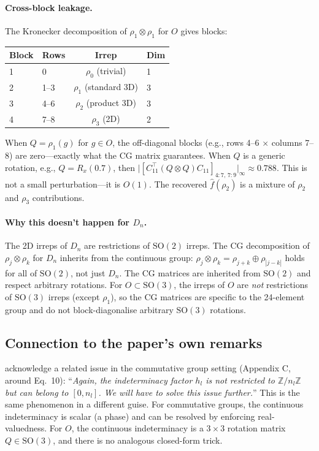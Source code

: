 \documentclass{article}
\newcommand{\SO}{\mathrm{SO}}
\newcommand{\abs}[1]{\lvert #1 \rvert}
\begin{document}
\paragraph{Cross-block leakage.}
The Kronecker decomposition of $\rho_1 \otimes \rho_1$ for $O$ gives
blocks:

\begin{center}
\small
\begin{tabular}{llcl}
  \toprule
  Block & Rows & Irrep & Dim \\
  \midrule
  1 & 0     & $\rho_0$ (trivial)     & 1 \\
  2 & 1--3  & $\rho_1$ (standard 3D) & 3 \\
  3 & 4--6  & $\rho_2$ (product 3D)  & 3 \\
  4 & 7--8  & $\rho_3$ (2D)          & 2 \\
  \bottomrule
\end{tabular}
\end{center}

When $Q = \rho_1(g)$ for $g \in O$, the off-diagonal blocks (e.g.,
rows 4--6 $\times$ columns 7--8) are zero---exactly what the CG
matrix guarantees. When $Q$ is a generic rotation, e.g.,
$Q = R_x(0.7)$, then
$\abs{[C_{11}^\top (Q \otimes Q) C_{11}]_{4:7,\, 7:9}}_\infty
\approx 0.788$.
This is not a small perturbation---it is $O(1)$. The recovered
$\hat{f}(\rho_2)$ is a mixture of $\rho_2$ and $\rho_3$ contributions.

\paragraph{Why this doesn't happen for $D_n$.}
The 2D irreps of $D_n$ are restrictions of $\SO(2)$ irreps. The CG
decomposition of $\rho_j \otimes \rho_k$ for $D_n$ inherits from the
continuous group: $\rho_j \otimes \rho_k = \rho_{j+k} \oplus
\rho_{|j-k|}$ holds for all of $\SO(2)$, not just $D_n$. The CG
matrices are inherited from $\SO(2)$ and respect arbitrary rotations.
For $O \subset \SO(3)$, the irreps of $O$ are \emph{not} restrictions
of $\SO(3)$ irreps (except $\rho_1$), so the CG matrices are specific
to the 24-element group and do not block-diagonalise arbitrary
$\SO(3)$ rotations.

\subsection{Connection to the paper's own remarks}

\citet{mataigne2024selective} acknowledge a related issue in the
commutative group setting (Appendix C, around Eq.~10):
``\emph{Again, the indeterminacy factor $h_l$ is not restricted to
$\mathbb{Z}/n_l\mathbb{Z}$ but can belong to $[0, n_l]$. We will
have to solve this issue further.}''
This is the same phenomenon in a different guise. For commutative
groups, the continuous indeterminacy is scalar (a phase) and can be
resolved by enforcing real-valuedness. For $O$, the continuous
indeterminacy is a $3 \times 3$ rotation matrix $Q \in \SO(3)$, and
there is no analogous closed-form trick.
\end{document}
